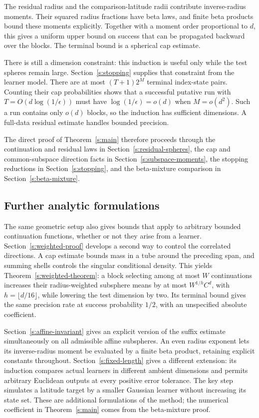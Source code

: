 The residual radius and the comparison-latitude radii contribute
inverse-radius moments. Their squared radius fractions have beta
laws, and finite beta products bound these moments explicitly.
Together with a moment order proportional to \(d\), this gives a
uniform upper bound on success that can be propagated backward over
the blocks. The terminal bound is a spherical cap estimate.

There is still a dimension constraint: this induction is useful only
while the test spheres remain large. Section~\ref{s:stopping} supplies
that constraint from the learner model. There are at most
\((T+1)2^M\) terminal index-state pairs. Counting their cap
probabilities shows that a successful putative run with
\(T=O(d\log(1/\epsilon))\) must have
\(\log(1/\epsilon)=o(d)\) when \(M=o(d^2)\). Such a run contains
only \(o(d)\) blocks, so the induction has sufficient dimensions.
A full-data residual estimate handles bounded precision.

The direct proof of Theorem~\ref{s:main} therefore proceeds through
the continuation and residual laws in Section~\ref{s:residual-spheres},
the cap and common-subspace direction facts in
Section~\ref{s:subspace-moments}, the stopping reductions in
Section~\ref{s:stopping}, and the beta-mixture comparison in
Section~\ref{s:beta-mixture}.

\subsection*{Further analytic formulations}

The same geometric setup also gives bounds that apply to arbitrary
bounded continuation functions, whether or not they arise from a
learner. Section~\ref{s:weighted-proof} develops a second way to
control the correlated directions. A cap estimate bounds mass in a
tube around the preceding span, and summing shells controls the
singular conditional density. This yields
Theorem~\ref{s:weighted-theorem}: a block selecting among at most
\(W\) continuations increases their radius-weighted subsphere means
by at most \(W^{1/h}C^d\), with \(h=\lfloor d/16\rfloor\),
while lowering the test dimension by two.
Its terminal bound gives the same precision rate at success
probability \(1/2\), with an unspecified absolute coefficient.

Section~\ref{s:affine-invariant} gives an explicit version of the
suffix estimate simultaneously on all admissible affine subspheres.
An even radius exponent lets its inverse-radius moment be evaluated
by a finite beta product, retaining explicit constants throughout.
Section~\ref{s:fixed-length} gives a different extension: its
induction compares actual learners in different ambient dimensions
and permits arbitrary Euclidean outputs at every positive error
tolerance. The key step simulates a latitude target by a smaller
Gaussian learner without increasing its state set. These are
additional formulations of the method; the numerical coefficient in
Theorem~\ref{s:main} comes from the beta-mixture proof.
